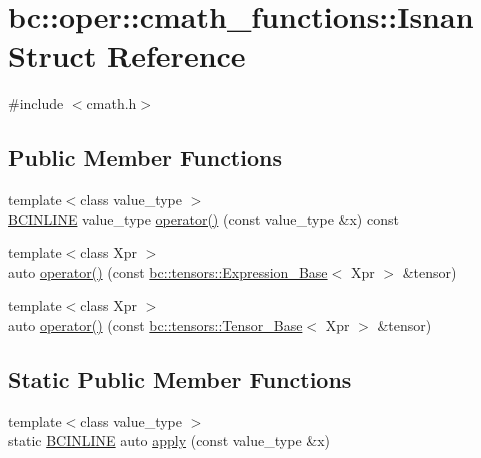 \hypertarget{structbc_1_1oper_1_1cmath__functions_1_1Isnan}{}\section{bc\+:\+:oper\+:\+:cmath\+\_\+functions\+:\+:Isnan Struct Reference}
\label{structbc_1_1oper_1_1cmath__functions_1_1Isnan}


{\ttfamily \#include $<$cmath.\+h$>$}

\subsection*{Public Member Functions}
\begin{DoxyCompactItemize}
\item 
{\footnotesize template$<$class value\+\_\+type $>$ }\\\hyperlink{common_8h_a6699e8b0449da5c0fafb878e59c1d4b1}{B\+C\+I\+N\+L\+I\+NE} value\+\_\+type \hyperlink{structbc_1_1oper_1_1cmath__functions_1_1Isnan_a3adb92aae01e1f19c5809a3431d4f7af}{operator()} (const value\+\_\+type \&x) const
\item 
{\footnotesize template$<$class Xpr $>$ }\\auto \hyperlink{structbc_1_1oper_1_1cmath__functions_1_1Isnan_a904a87a5d5700019a8cd54c513e333c5}{operator()} (const \hyperlink{classbc_1_1tensors_1_1Expression__Base}{bc\+::tensors\+::\+Expression\+\_\+\+Base}$<$ Xpr $>$ \&tensor)
\item 
{\footnotesize template$<$class Xpr $>$ }\\auto \hyperlink{structbc_1_1oper_1_1cmath__functions_1_1Isnan_a37eb8c5f0effa015649267708915cbd6}{operator()} (const \hyperlink{classbc_1_1tensors_1_1Tensor__Base}{bc\+::tensors\+::\+Tensor\+\_\+\+Base}$<$ Xpr $>$ \&tensor)
\end{DoxyCompactItemize}
\subsection*{Static Public Member Functions}
\begin{DoxyCompactItemize}
\item 
{\footnotesize template$<$class value\+\_\+type $>$ }\\static \hyperlink{common_8h_a6699e8b0449da5c0fafb878e59c1d4b1}{B\+C\+I\+N\+L\+I\+NE} auto \hyperlink{structbc_1_1oper_1_1cmath__functions_1_1Isnan_a3849d715381c4e3be0e246a25ea7ff75}{apply} (const value\+\_\+type \&x)
\end{DoxyCompactItemize}


